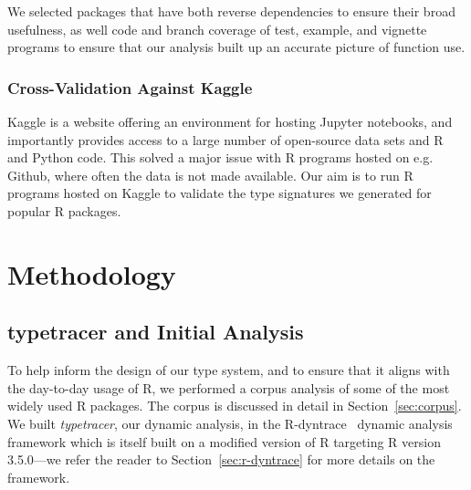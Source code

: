 \documentclass[acmsmall,review,anonymous]{acmart}\settopmatter{printfolios=true,printccs=false,printacmref=false}
\newcommand{\typetracer}{\emph{typetracer}\xspace} %
\begin{document}

We selected packages that have both  reverse dependencies to ensure their broad usefulness, as well  code and branch coverage of test, example, and vignette programs to ensure that our analysis built up an accurate picture of function use.

%
%
\subsubsection{Cross-Validation Against Kaggle}

Kaggle is a website offering an environment for hosting Jupyter notebooks, and importantly provides access to a large number of open-source data sets and R and Python code.
This solved a major issue with R programs hosted on e.g. Github, where often the data is not made available.
Our aim is to run R programs hosted on Kaggle to validate the type signatures we generated for popular R packages.


%
%
%
%
%
%
\section{Methodology}

%
%
%
%
\subsection{typetracer and Initial Analysis}


To help inform the design of our type system, and to ensure that it aligns with the day-to-day usage of R, we performed a corpus analysis of some of the most widely used R packages.
The corpus is discussed in detail in Section~\ref{sec:corpus}.
We built \typetracer, our dynamic analysis, in the R-dyntrace~\cite{oopsla19} dynamic analysis framework which is itself built on a modified version of R targeting R version 3.5.0---we refer the reader to Section~\ref{sec:r-dyntrace} for more details on the framework.
\end{document}
